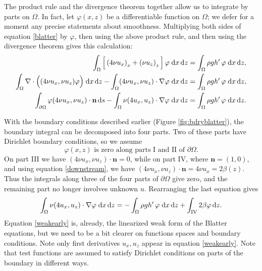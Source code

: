 \documentclass[11pt,final,reqno]{amsart}
\theoremstyle{remark}
\theoremstyle{definition}
\begin{document}
The product rule and the divergence theorem together allow us to integrate by parts on $\Omega$.  In fact, let $\varphi(x,z)$ be a differentiable function on $\Omega$; we defer for a moment any precise statements about smoothness.  Multiplying both sides of equation \eqref{blatter} by $\varphi$, then using the above product rule, and then using the divergence theorem gives this calculation:
\begin{align*}
    \int_\Omega \Big[\left(4 \nu u_x\right)_x + \left(\nu u_z\right)_z\Big]\,\varphi \;\mathrm{d}x\,\mathrm{d}z &= \int_\Omega \rho g h'\,\varphi \;\mathrm{d}x\,\mathrm{d}z, \\
    \int_\Omega \nabla \cdot \Big((4 \nu u_x,\nu u_z) \varphi\Big)\;\mathrm{d}x\,\mathrm{d}z - \int_\Omega (4 \nu u_x,\nu u_z) \cdot \nabla \varphi \;\mathrm{d}x\,\mathrm{d}z &= \int_\Omega \rho g h'\,\varphi \;\mathrm{d}x\,\mathrm{d}z, \\
    \int_{\partial\Omega} \varphi(4 \nu u_x, \nu u_z) \cdot \mathbf{n}\,\mathrm{d}s - \int_\Omega \nu (4 u_x, u_z) \cdot \nabla \varphi \;\mathrm{d}x\,\mathrm{d}z &= \int_\Omega \rho g h'\,\varphi \;\mathrm{d}x\,\mathrm{d}z.
\end{align*}

With the boundary conditions described earlier (Figure \ref{fig:bdryblatter}), the boundary integral can be decomposed into four parts.  Two of these parts have Dirichlet boundary conditions, so we assume
	$$\varphi(x,z) \text{ is zero along parts I and II of } \partial \Omega.$$
On part III we have $(4 \nu u_x, \nu u_z) \cdot \mathbf{n} = 0$, while on part IV, where $\mathbf{n} = (1,0)$, and using equation \eqref{downstream}, we have $(4 \nu u_x, \nu u_z) \cdot \mathbf{n} = 4 \nu u_x = 2\beta(z)$.  Thus the integrals along three of the four parts of $\partial\Omega$ give zero, and the remaining part no longer involves unknown $u$.  Rearranging the last equation gives
\begin{equation}
\int_\Omega \nu (4 u_x, u_z) \cdot \nabla \varphi \;\mathrm{d}x\,\mathrm{d}z = - \int_\Omega \rho g h'\,\varphi \;\mathrm{d}x\,\mathrm{d}z + \int_{\mathrm{IV}} 2 \beta \varphi \,\mathrm{d}z.  \label{weakearly}
\end{equation}
Equation \eqref{weakearly} is, already, the linearized weak form of the Blatter equations, but we need to be a bit clearer on functions spaces and boundary conditions.  Note only first derivatives $u_x,u_z$ appear in equation \eqref{weakearly}.  Note that test functions are assumed to satisfy Dirichlet conditions on parts of the boundary in different ways.
\end{document}
